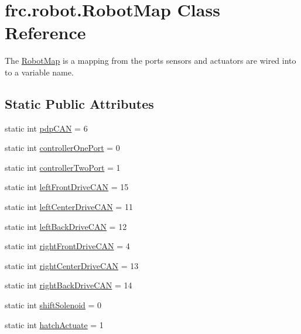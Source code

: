 \hypertarget{classfrc_1_1robot_1_1_robot_map}{}\section{frc.\+robot.\+Robot\+Map Class Reference}
\label{classfrc_1_1robot_1_1_robot_map}


The \hyperlink{classfrc_1_1robot_1_1_robot_map}{Robot\+Map} is a mapping from the ports sensors and actuators are wired into to a variable name.  


\subsection*{Static Public Attributes}
\begin{DoxyCompactItemize}
\item 
static int \hyperlink{classfrc_1_1robot_1_1_robot_map_af7db1426412719318df15f9838b70198}{pdp\+C\+AN} = 6
\item 
static int \hyperlink{classfrc_1_1robot_1_1_robot_map_adf0118e5a9de03d6f71ea1e5a6a81cc9}{controller\+One\+Port} = 0
\item 
static int \hyperlink{classfrc_1_1robot_1_1_robot_map_a762ebcaa07378c37d88654506850e07f}{controller\+Two\+Port} = 1
\item 
static int \hyperlink{classfrc_1_1robot_1_1_robot_map_a2e3dbfb148d6fa2b7f430614887217f0}{left\+Front\+Drive\+C\+AN} = 15
\item 
static int \hyperlink{classfrc_1_1robot_1_1_robot_map_a9d04abf669a5ad42cb023e3ff3b56bcd}{left\+Center\+Drive\+C\+AN} = 11
\item 
static int \hyperlink{classfrc_1_1robot_1_1_robot_map_a0f78f6850b0e060cc6acd88cc80ffa04}{left\+Back\+Drive\+C\+AN} = 12
\item 
static int \hyperlink{classfrc_1_1robot_1_1_robot_map_a4ca461a7ad91df180971974fd6abc236}{right\+Front\+Drive\+C\+AN} = 4
\item 
static int \hyperlink{classfrc_1_1robot_1_1_robot_map_a3ca36356410531e52126d2979ee17f13}{right\+Center\+Drive\+C\+AN} = 13
\item 
static int \hyperlink{classfrc_1_1robot_1_1_robot_map_a0fb2fff6bf26e3f196d1cb02a89072c3}{right\+Back\+Drive\+C\+AN} = 14
\item 
static int \hyperlink{classfrc_1_1robot_1_1_robot_map_aeb2d5ba2420aa4acb2c40f409580df82}{shift\+Solenoid} = 0
\item 
static int \hyperlink{classfrc_1_1robot_1_1_robot_map_a7bec1963c7590911eb30697b0707d9b4}{hatch\+Actuate} = 1

\end{DoxyCompactItemize}
